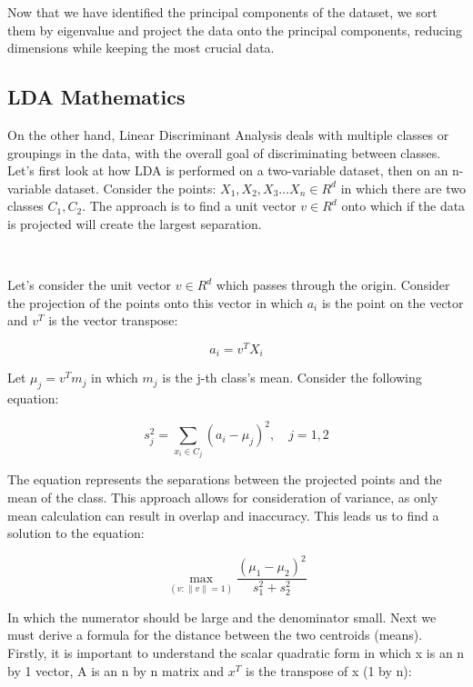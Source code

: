 \documentclass{article}
\begin{document}
Now that we have identified the principal components of the dataset, we sort them by eigenvalue and project the data onto the principal components, reducing dimensions while keeping the most crucial data. 

\subsection{LDA Mathematics}
On the other hand, Linear Discriminant Analysis deals with multiple classes or groupings in the data, with the overall goal of discriminating between classes. Let's first look at how LDA is performed on a two-variable dataset, then on an n-variable dataset. Consider the points: $X_1, X_2, X_3 \dots X_n \in R^d$ in which there are two classes $C_1, C_2$. The approach is to find a unit vector $v \in R^d$ onto which if the data is projected will create the largest separation.

\

Let's consider the unit vector $v \in R^d$ which passes through the origin. Consider the projection of the points onto this vector in which $a_i$ is the point on the vector and $v^T$ is the vector transpose:

\begin{equation*}
a_i = v^T X_i
\end{equation*}

Let $\mu_j = v^T m_j$ in which $m_j$ is the j-th class's mean. Consider the following equation:

\begin{equation*}
s_j^2 = \sum_{x_i \in C_j} (a_i - \mu_j)^2, \quad j = 1,2
\end{equation*}

The equation represents the separations between the projected points and the mean of the class. This approach allows for consideration of variance, as only mean calculation can result in overlap and inaccuracy. This leads us to find a solution to the equation:

\begin{equation*}
\max_{(v: \|v\| = 1)} \frac{(\mu_1 - \mu_2)^2}{s_1^2 + s_2^2}
\end{equation*}

In which the numerator should be large and the denominator small. Next we must derive a formula for the distance between the two centroids (means). Firstly, it is important to understand the scalar quadratic form in which x is an n by 1 vector, A is an n by n matrix and $x^T$ is the transpose of x (1 by n):
\end{document}
